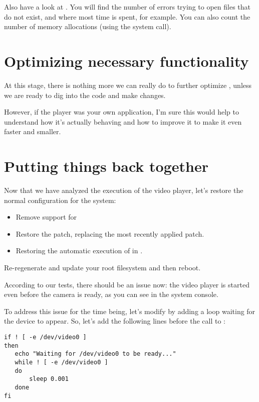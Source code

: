 Also have a look at . You will find the number
of errors trying to open files that do not exist, and where most time is
spent, for example. You can also count the number of memory allocations
(using the  system call).

\section{Optimizing necessary functionality}

At this stage, there is nothing more we can really do to further
optimize , unless we are ready to dig into the code and
make changes.

However, if the player was your own application, I'm sure this would
help to understand how it's actually behaving and how to improve it to
make it even faster and smaller.

\section{Putting things back together}

Now that we have analyzed the execution of the video player, let's
restore the normal configuration for the system:

\begin{itemize}
\item Remove support for 
\item Restore the
       patch,
      replacing the most recently applied patch.
\item Restoring the automatic execution of  in
      .
\end{itemize}

Re-regenerate and update your root filesystem and then reboot.

According to our tests, there should be an issue now: the video player
is started even before the camera is ready, as you can see in the system
console.

To address this issue for the time being, let's modify 
by adding a loop waiting for the  device to appear.
So, let's add the following lines before the call to :

\begin{verbatim}
if ! [ -e /dev/video0 ]
then
   echo "Waiting for /dev/video0 to be ready..."
   while ! [ -e /dev/video0 ]
   do
       sleep 0.001
   done
fi
\end{verbatim}

